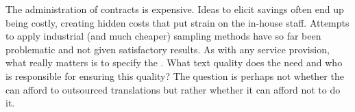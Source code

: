 \documentclass[output=paper]{langsci/langscibook}
\begin{document}
The administration of contracts is expensive. Ideas to elicit savings often end up being costly, creating hidden costs that put strain on the in-house staff. Attempts to apply industrial (and much cheaper) sampling methods have so far been problematic and not given satisfactory results. As with any service provision, what really matters is to specify the . What text quality does the  need and who is responsible for ensuring this quality? The question is perhaps not whether the  can afford to  outsourced translations but rather whether it can afford not to do it.
%  

\sloppy
\printbibliography[heading=subbibliography,notkeyword=this] 
\end{document}
